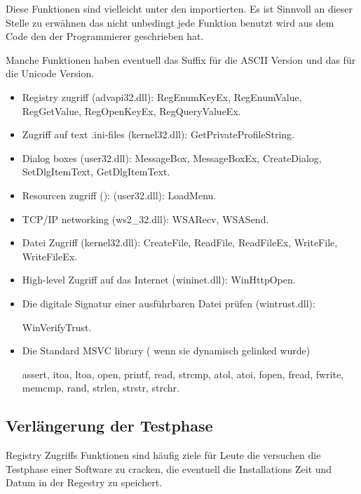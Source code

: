 Diese Funktionen sind vielleicht unter den importierten.
Es ist Sinnvoll an dieser Stelle zu erw\"ahnen das nicht unbedingt jede Funktion benutzt wird aus 
dem Code den der Programmierer geschrieben hat.

Manche Funktionen haben eventuell das  Suffix f\"ur die ASCII Version und das  f\"ur die Unicode Version.


\begin{itemize}

\item
Registry zugriff (advapi32.dll): 
RegEnumKeyEx, RegEnumValue, RegGetValue, RegOpenKeyEx, RegQueryValueEx.

\item
Zugriff auf text .ini-files (kernel32.dll): 
GetPrivateProfileString.

\item
Dialog boxes (user32.dll): 
MessageBox, MessageBoxEx, CreateDialog, SetDlgItemText, GetDlgItemText.

\item
Resourcen zugriff (): (user32.dll): LoadMenu.

\item
TCP/IP networking (ws2\_32.dll):
WSARecv, WSASend.

\item
Datei Zugriff (kernel32.dll):
CreateFile, ReadFile, ReadFileEx, WriteFile, WriteFileEx.

\item
High-level Zugriff auf das Internet (wininet.dll): WinHttpOpen.

\item
Die digitale Signatur einer ausf\"uhrbaren Datei pr\"ufen (wintrust.dll):

WinVerifyTrust.

\item
Die Standard MSVC library ( wenn sie dynamisch gelinked wurde) 

assert, itoa, ltoa, open, printf, read, strcmp, atol, atoi, fopen, fread, fwrite, memcmp, rand,
strlen, strstr, strchr.

\end{itemize}

\subsection{Verl\"angerung der Testphase}

Registry Zugriffs Funktionen sind h\"aufig ziele f\"ur Leute die versuchen die Testphase einer Software zu cracken, die 
eventuell die Installations Zeit und Datum in der Regestry zu speichert. 

